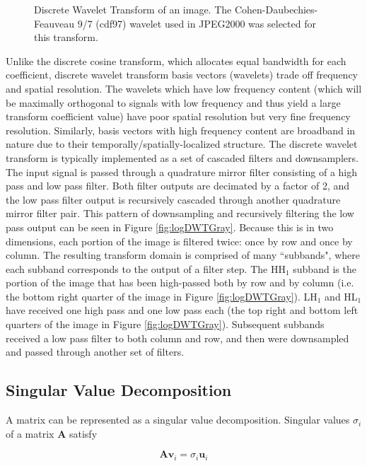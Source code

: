 \documentclass[conference]{IEEEtran}
\begin{document}
\begin{figure}[htbp]
    \caption{Discrete Wavelet Transform of an image. The Cohen-Daubechies-Feauveau 9/7 (cdf97) wavelet used in JPEG2000 was selected for this transform.}
    \label{fig:dwtImage}
\end{figure}

Unlike the discrete cosine transform, which allocates equal bandwidth for each coefficient, discrete wavelet transform basis vectors (wavelets) trade off frequency and spatial resolution.
The wavelets which have low frequency content (which will be maximally orthogonal to signals with low frequency and thus yield a large transform coefficient value) have poor spatial resolution but very fine frequency resolution.
Similarly, basis vectors with high frequency content are broadband in nature due to their temporally/spatially-localized structure.
The discrete wavelet transform is typically implemented as a set of cascaded filters and downsamplers.
The input signal is passed through a quadrature mirror filter consisting of a high pass and low pass filter.
Both filter outputs are decimated by a factor of 2, and the low pass filter output is recursively cascaded through another quadrature mirror filter pair.
This pattern of downsampling and recursively filtering the low pass output can be seen in Figure \ref{fig:logDWTGray}.
Because this is in two dimensions, each portion of the image is filtered twice: once by row and once by column.
The resulting transform domain is comprised of many ``subbands", where each subband corresponds to the output of a filter step.
The HH$_1$ subband is the portion of the image that has been high-passed both by row and by column (i.e. the bottom right quarter of the image in Figure \ref{fig:logDWTGray}).
LH$_1$ and HL$_1$ have received one high pass and one low pass each (the top right and bottom left quarters of the image in Figure \ref{fig:logDWTGray}).
Subsequent subbands received a low pass filter to both column and row, and then were downsampled and passed through another set of filters.

\subsection{Singular Value Decomposition}

A matrix can be represented as a singular value decomposition.
Singular values $\sigma_i$ of a matrix $\mathbf{A}$ satisfy

\begin{equation}
    \mathbf{A}\mathbf{v}_i = \sigma_i\mathbf{u}_i
\end{equation}
\end{document}
